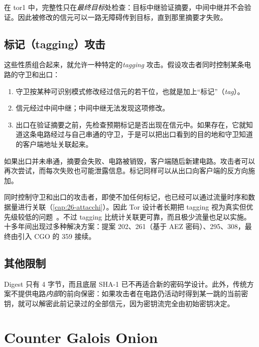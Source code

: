 在 tor1 中，完整性只在\emph{最终目标}处检查：目标中继验证摘要，中间中继并不会验证。因此被修改的信元可以一路无障碍传到目标，直到那里摘要才失败。

\subsection{标记（tagging）攻击}

这些性质组合起来，就允许一种特定的\emph{tagging} 攻击。假设攻击者同时控制某条电路的守卫和出口：
\begin{enumerate}
  \item 守卫按某种可识别模式修改经过信元的若干位，也就是加上\enquote{标记}（\emph{tag}）。
  \item 信元经过中间中继；中间中继无法发现这项修改。
  \item 出口在验证摘要之前，先检查预期标记是否出现在信元中。如果存在，它就知道这条电路经过与自己串通的守卫，于是可以把出口看到的目的地和守卫知道的客户端地址关联起来。
\end{enumerate}

如果出口并未串通，摘要会失败、电路被销毁，客户端随后新建电路。攻击者可以再次尝试，而每次失败也可能泄露信息。标记同样可以从出口向客户端的反方向施加。

\begin{approfondimento}
同时控制守卫和出口的攻击者，即使不加任何标记，也已经可以通过流量时序和数据量进行关联（\cref{cap:26-attacchi}）。因此 Tor 设计者长期把 tagging 视为真实但优先级较低的问题~\cite{dingledine2004tor}。不过 tagging 比统计关联更可靠，而且极少流量也足以实施。十多年间出现过多种解决方案：提案 202、261（基于 AEZ 密码）、295、308，最终由引入 CGO 的 359 接续。
\end{approfondimento}

\subsection{其他限制}

Digest 只有 4 字节，而且底层 SHA-1 已不再适合新的密码学设计。此外，传统方案不提供电路\emph{内部}的前向保密：如果攻击者在电路仍活动时得到某一跳的当前密钥，就可以解密此前记录过的全部信元，因为密钥流完全由初始密钥决定。

\section{Counter Galois Onion}\label{sec:cgo}


